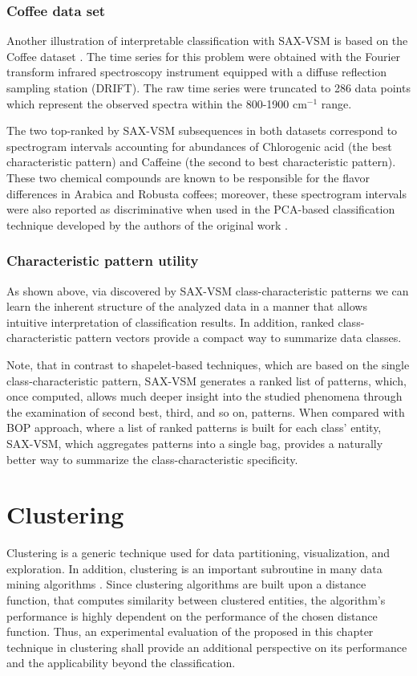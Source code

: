\subsubsection{Coffee data set}
Another illustration of interpretable classification with SAX-VSM is based on the Coffee dataset \cite{citeulike:12550833}.
The time series for this problem were obtained with the Fourier transform infrared spectroscopy instrument equipped 
with a diffuse reflection sampling station (DRIFT). The raw time series were truncated to 286 data points which represent 
the observed spectra within the 800-1900 cm$^{-1}$ range. 

The two top-ranked by SAX-VSM subsequences in both datasets correspond to spectrogram intervals accounting for
abundances of Chlorogenic acid (the best characteristic pattern) and Caffeine (the second to best characteristic pattern).
These two chemical compounds are known to be responsible for the flavor differences in Arabica and Robusta coffees; 
moreover, these spectrogram intervals were also reported as discriminative when used in the PCA-based classification 
technique developed by the authors of the original work \cite{citeulike:12550833}.

\subsubsection{Characteristic pattern utility}
As shown above, via discovered by SAX-VSM class-characteristic patterns we can learn the inherent structure of the analyzed data in a manner that allows intuitive interpretation of classification results. In addition, ranked class-characteristic pattern vectors provide a compact way to summarize data classes. 

Note, that in contrast to shapelet-based techniques, which are based on the single class-characteristic pattern, SAX-VSM generates a ranked list of patterns, which, once computed, allows much deeper insight into the studied phenomena through the examination of  second best, third, and so on, patterns. 
When compared with BOP approach, where a list of ranked patterns is built for each class' entity, SAX-VSM, which aggregates patterns into a single bag, provides a naturally better way to summarize the class-characteristic specificity. 

\section{Clustering}\label{saxvsm_clustering}
Clustering is a generic technique used for data partitioning, visualization, and exploration.
In addition, clustering is an important subroutine in many data mining algorithms \cite{citeulike:167581}.
Since clustering algorithms are built upon a distance function, that computes similarity between clustered entities,
the algorithm's performance is highly dependent on the performance of the chosen distance function. 
Thus, an experimental evaluation of the proposed in this chapter technique in clustering shall provide an additional 
perspective on its performance and the applicability beyond the classification.

